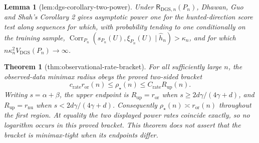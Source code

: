\documentclass{article}
\newtheorem{theorem}{Theorem}
\newtheorem{lemma}{Lemma}
\begin{document}
\begin{lemma}[lem:dgs-corollary-two-power]\label{lem:dgs-corollary-two-power}
Under \(\mathsf R_{\mathrm{DGS},n}(P_n)\), Dhawan, Guo and Shah's Corollary 2 gives asymptotic power one for the hunted-direction score test along sequences for which, with probability tending to one conditionally on the training sample, \(\operatorname{Corr}_{P_n}(s_{P_n}(U),\xi_{P_n}(U)\mid\widehat h_n)>\kappa_n\), and for which \(n\kappa_n^2V_{\mathrm{DGS}}(P_n)\to\infty\).
\end{lemma}

\begin{theorem}[thm:observational-rate-bracket]\label{thm:observational-rate-bracket}
For all sufficiently large \(n\), the observed-data minimax radius obeys the proved two-sided bracket
\[
 c_{\mathrm{rate}}r_{\mathrm{or}}(n)
 \le\rho_\star(n)
 \le C_{\mathrm{rate}}R_{\mathrm{up}}(n).
\]
Writing \(s=\alpha+\beta\), the upper endpoint is \(R_{\mathrm{up}}=r_{\mathrm{or}}\) when \(s\ge 2d\gamma/(4\gamma+d)\), and \(R_{\mathrm{up}}=r_{\mathrm{nu}}\) when \(s<2d\gamma/(4\gamma+d)\).  Consequently \(\rho_\star(n)\asymp r_{\mathrm{or}}(n)\) throughout the first region.  At equality the two displayed power rates coincide exactly, so no logarithm occurs in this proved bracket.  This theorem does not assert that the bracket is minimax-tight when its endpoints differ.
\end{theorem}
\end{document}
